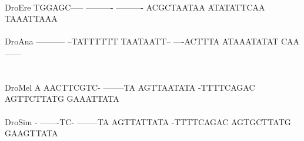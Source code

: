 \documentclass[11pt,twoside,reqno,a4paper]{article}
\begin{document}
{\hspace*{7\charwidth}\hspace*{1\charwidth}\hspace*{1\charwidth}\hspace*{1\charwidth}\hspace*{1\charwidth}\hspace*{1\charwidth}\\
DroEre	TGGAGC-----	----------	----------	ACGCTAATAA	ATATATTCAA	TAAATTAAA\\
\hspace*{7\charwidth}\hspace*{1\charwidth}\hspace*{1\charwidth}\hspace*{1\charwidth}\hspace*{1\charwidth}\hspace*{1\charwidth}\\
DroAna	-----------	--TATTTTTT	TAATAATT--	----ACTTTA	ATAAATATAT	CAA------\\
\hspace*{7\charwidth}\hspace*{1\charwidth}\hspace*{1\charwidth}\hspace*{1\charwidth}\hspace*{1\charwidth}\hspace*{1\charwidth}\\
\\
DroMel	A	AACTTCGTC-	--------TA	AGTTAATATA	-TTTTCAGAC	AGTTCTTATG	GAAATTATA\\
\hspace*{7\charwidth}\hspace*{1\charwidth}\hspace*{1\charwidth}\hspace*{1\charwidth}\hspace*{1\charwidth}\hspace*{1\charwidth}\hspace*{1\charwidth}\\
DroSim	-	-------TC-	--------TA	AGTTATTATA	-TTTTCAGAC	AGTGCTTATG	GAAGTTATA\\
\hspace*{7\charwidth}\hspace*{1\charwidth}\hspace*{1\charwidth}\hspace*{1\charwidth}\hspace*{1\charwidth}\hspace*{1\charwidth}\hspace*{1\charwidth}\\
}
\end{document}
